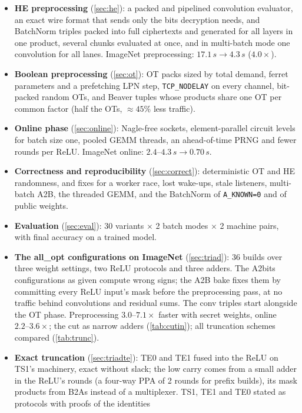 \documentclass[10pt,a4paper]{article}
\newcommand{\flag}[1]{\nolinkurl{#1}}
\newcommand{\s}{\,s\xspace}
\begin{document}
\begin{itemize}\itemsep1pt
\item \textbf{HE preprocessing} (\cref{sec:he}): a packed and pipelined convolution evaluator, an exact
  wire format that sends only the bits decryption needs, and BatchNorm triples packed into full
  ciphertexts and generated for all layers in one product, several chunks evaluated at once, and in multi-batch
  mode one convolution for all lanes. ImageNet preprocessing: $17.1\s \to 4.3\s$ ($4.0\times$).
\item \textbf{Boolean preprocessing} (\cref{sec:ot}): OT packs sized by total demand, ferret parameters and
  a prefetching LPN step, \flag{TCP_NODELAY} on every channel, bit-packed random OTs, and Beaver tuples
  whose products share one OT per common factor (half the OTs, ${\approx}45\%$ less traffic).
\item \textbf{Online phase} (\cref{sec:online}): Nagle-free sockets, element-parallel circuit levels for
  batch size one, pooled GEMM threads, an ahead-of-time PRNG and fewer rounds per ReLU. ImageNet online: $2.4\text{--}4.3\s \to 0.70\s$.
\item \textbf{Correctness and reproducibility} (\cref{sec:correct}): deterministic OT and HE randomness,
  and fixes for a worker race, lost wake-ups, stale listeners, multi-batch A2B, the threaded GEMM, and the
  BatchNorm of \flag{A_KNOWN=0} and of public weights.
\item \textbf{Evaluation} (\cref{sec:eval}): 30 variants $\times$ 2 batch modes $\times$ 2 machine pairs,
  with final accuracy on a trained model.
\item \textbf{The all\_opt configurations on ImageNet} (\cref{sec:triad}): 36 builds over three weight settings, two
  ReLU protocols and three adders. The A2bits configurations as given compute wrong signs; the A2B bake fixes them
  by committing every ReLU input's mask before the preprocessing pass, at no traffic behind convolutions and residual
  sums. The conv triples start alongside the OT phase. Preprocessing $3.0\text{--}7.1\times$ faster with secret weights,
  online $2.2\text{--}3.6\times$; the cut as narrow adders (\cref{tab:cutin}); all truncation schemes compared
  (\cref{tab:trunc}).
\item \textbf{Exact truncation} (\cref{sec:triadte}): TE0 and TE1 fused into the ReLU on TS1's machinery, exact without
  slack; the low carry comes from a small adder in the ReLU's rounds (a four-way PPA of 2 rounds for prefix builds), its
  mask products from B2As instead of a multiplexer. TS1, TE1 and TE0 stated as protocols with proofs of the identities

\end{itemize}
\end{document}

